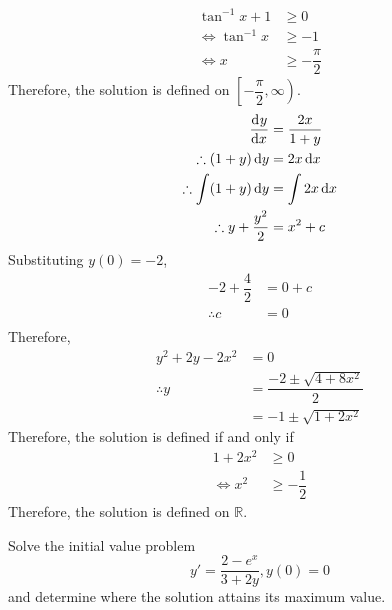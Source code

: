 \documentclass[fleqn, a4paper, 12pt, oneside]{amsart}
\theoremstyle{definition}
\theoremstyle{theorem}
\begin{document}
\begin{solution}
\begin{tasks}
			\begin{align*}
				\tan^{-1} x + 1 &\ge 0\\
				\iff \tan^{-1} x &\ge -1\\
				\iff x &\ge -\dfrac{\pi}{2}
			\end{align*}
			Therefore, the solution is defined on $\left[ -\dfrac{\pi}{2}, \infty \right)$.
		\task
			\begin{align*}
				\dod{y}{x} &= \dfrac{2x}{1 + y}\\
				\therefore (1 + y) \dif y &= 2 x \dif x\\
				\therefore \int (1 + y) \dif y &= \int 2 x \dif x\\
				\therefore y + \dfrac{y^2}{2} &= x^2 + c
			\end{align*}
			Substituting $y(0) = -2$,
			\begin{align*}
				-2 + \dfrac{4}{2} &= 0 + c\\
				\therefore c &= 0\\
			\end{align*}
			Therefore,
			\begin{align*}
				y^2 + 2y - 2x^2 &= 0\\
				\therefore y &= \dfrac{-2 \pm \sqrt{4 + 8x^2}}{2}\\
				&= -1 \pm \sqrt{1 + 2x^2}
			\end{align*}
			Therefore, the solution is defined if and only if
			\begin{align*}
				1 + 2x^2 &\ge 0\\
				\iff x^2 &\ge -\dfrac{1}{2}
			\end{align*}
			Therefore, the solution is defined on $\mathbb{R}$.
	\end{tasks}
\end{solution}

\begin{question}
	Solve the initial value problem
	\begin{equation*}
		y' = \dfrac{2 - e^x}{3 + 2y}, y(0) = 0
	\end{equation*}
	and determine where the solution attains its maximum value.
\end{question}
\end{document}
